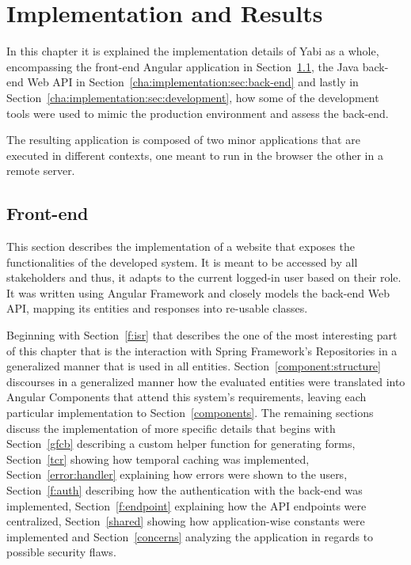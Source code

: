 \chapter{Implementation and Results}\label{cha:implementation}
In this chapter it is explained the implementation details of \gls{Yabi} as a whole, encompassing the front-end Angular application in Section~\ref{cha:implementation:sec:front-end}, the Java back-end Web \gls{API} in Section~\ref{cha:implementation:sec:back-end} and lastly in Section~\ref{cha:implementation:sec:development}, how some of the development tools were used to mimic the production environment and assess the back-end.

The resulting application is composed of two minor applications that are executed in different contexts, one meant to run in the browser the other in a remote server.

\section{Front-end}\label{cha:implementation:sec:front-end}
This section describes the implementation of a website that exposes the functionalities of the developed system. It is meant to be accessed by all stakeholders and thus, it adapts to the current logged-in user based on their role. It was written using Angular Framework and closely models the back-end Web \gls{API}, mapping its entities and responses into re-usable classes.

Beginning with Section~\ref{f:isr} that describes the one of the most interesting part of this chapter that is the interaction with Spring Framework's Repositories in a generalized manner that is used in all entities. Section~\ref{component:structure} discourses in a generalized manner how the evaluated entities were translated into Angular Components that attend this system's requirements, leaving each particular implementation to Section~\ref{components}. The remaining sections discuss the implementation of more specific details that begins with Section~\ref{gfcb} describing a custom helper function for generating forms, Section~\ref{tcr} showing how temporal caching was implemented, Section~\ref{error:handler} explaining how errors were shown to the users, Section~\ref{f:auth} describing how the authentication with the back-end was implemented, Section~\ref{f:endpoint} explaining how the \gls{API} endpoints were centralized, Section~\ref{shared} showing how application-wise constants were implemented and Section~\ref{concerns} analyzing the application in regards to possible security flaws.

